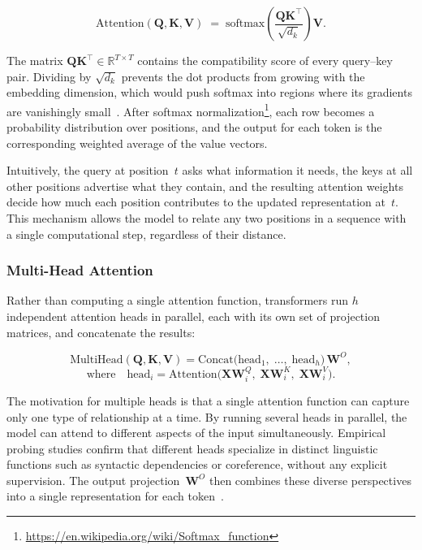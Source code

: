 \begin{equation}
    \text{Attention}(\mathbf{Q}, \mathbf{K}, \mathbf{V})
    \;=\; \text{softmax}\!\left(\frac{\mathbf{Q}\mathbf{K}^{\!\top}}{\sqrt{d_k}}\right)\mathbf{V}.
    \label{eq:attention}
\end{equation}

The matrix $\mathbf{Q}\mathbf{K}^{\!\top} \in \mathbb{R}^{T \times T}$ contains the compatibility score of every query--key pair. Dividing by $\sqrt{d_k}$ prevents the dot products from growing with the embedding dimension, which would push softmax into regions where its gradients are vanishingly small~\cite{vaswani2023attentionneed}. After softmax normalization\footnote{\url{https://en.wikipedia.org/wiki/Softmax_function}}, each row becomes a probability distribution over positions, and the output for each token is the corresponding weighted average of the value vectors.

Intuitively, the query at position~$t$ asks what information it needs, the keys at all other positions advertise what they contain, and the resulting attention weights decide how much each position contributes to the updated representation at~$t$. This mechanism allows the model to relate any two positions in a sequence with a single computational step, regardless of their distance.

\subsubsection*{Multi-Head Attention}
Rather than computing a single attention function, transformers run $h$ independent attention heads in parallel, each with its own set of projection matrices, and concatenate the results:

\begin{equation}
    \text{MultiHead}(\mathbf{Q}, \mathbf{K}, \mathbf{V})
    = \text{Concat}\!\bigl(\text{head}_1,\;\ldots,\;\text{head}_h\bigr)\,\mathbf{W}^O,
    \label{eq:multihead}
\end{equation}
\begin{equation}
    \text{where}\quad \text{head}_i = \text{Attention}\!\bigl(\mathbf{X}\mathbf{W}^Q_i,\;\mathbf{X}\mathbf{W}^K_i,\;\mathbf{X}\mathbf{W}^V_i\bigr).
    \label{eq:head-i}
\end{equation}

The motivation for multiple heads is that a single attention function can capture only one type of relationship at a time. By running several heads in parallel, the model can attend to different aspects of the input simultaneously. Empirical probing studies confirm that different heads specialize in distinct linguistic functions such as syntactic dependencies or coreference, without any explicit supervision. The output projection~$\mathbf{W}^O$ then combines these diverse perspectives into a single representation for each token~\cite{clark2019doesbertlookat}.

